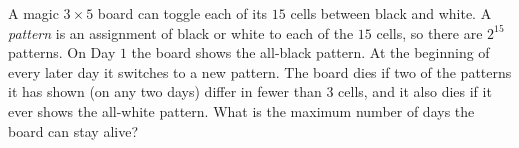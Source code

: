 A magic $3\times5$ board can toggle each of its $15$ cells between black and white. A \emph{pattern} is an assignment of black or white to each of the $15$ cells, so there are $2^{15}$ patterns. On Day $1$ the board shows the all-black pattern. At the beginning of every later day it switches to a new pattern. The board dies if two of the patterns it has shown (on any two days) differ in fewer than $3$ cells, and it also dies if it ever shows the all-white pattern. What is the maximum number of days the board can stay alive?
